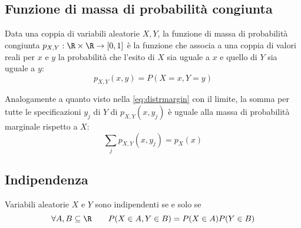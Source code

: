 \subsection{Funzione di massa di probabilità congiunta}
\begin{defin}
	Data una coppia di variabili aleatorie $X, Y$, la funzione di massa di probabilità congiunta $p_{X,Y}:\R\times\R\to[0,1]$ è la funzione che associa a una coppia di valori reali per $x$ e $y$ la probabilità che l'esito di $X$ sia uguale a $x$ e quello di $Y$ sia uguale a $y$:
	\begin{equation*}
		p_{X,Y}(x,y)=P(X=x,Y=y)
	\end{equation*}
\end{defin}

Analogamente a quanto visto nella \eqref{eq:distrmargin} con il limite, la somma per tutte le specificazioni $y_j$ di $Y$ di $p_{X,Y}(x,y_j)$ è uguale alla massa di probabilità marginale rispetto a $X$:
\begin{equation} \label{eq:massamargin}
	\sum_j p_{X,Y}(x,y_j) = p_X(x)
\end{equation}




\subsection{Indipendenza}
\begin{defin}
	Variabili aleatorie $X$ e $Y$ sono indipendenti se e solo se
	\begin{equation*}
		\forall A,B\subseteq\R\qquad P(X\in A, Y\in B)=P(X\in A)P(Y\in B)
	\end{equation*}
\end{defin}

